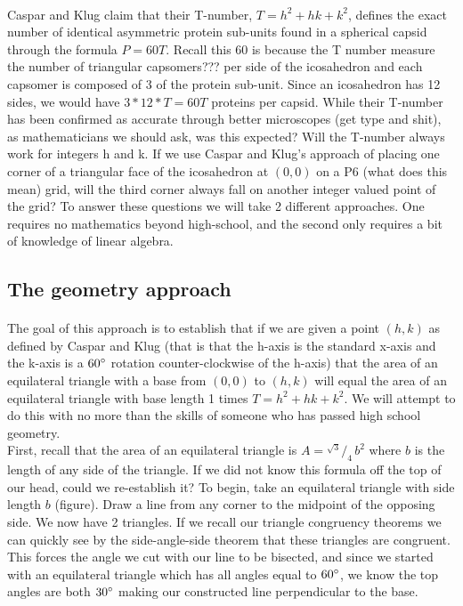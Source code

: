 \documentclass[12pt,letter]{article}
\newcommand*\rfrac[2]{{}^{#1}\!/_{#2}}
\begin{document}
\paragraph{}
Caspar and Klug claim that their T-number, $T = h^2 + hk + k^2$, defines the exact number of identical asymmetric protein sub-units found in a spherical capsid through the formula $P = 60T$. Recall this 60 is because the T number measure the number of triangular capsomers??? per side of the icosahedron and each capsomer is composed of 3 of the protein sub-unit. Since an icosahedron has 12 sides, we would have $3*12*T = 60T$ proteins per capsid. While their T-number has been confirmed as accurate through better microscopes (get type and shit), as mathematicians we should ask, was this expected? Will the T-number always work for integers h and k. If we use Caspar and Klug's approach of placing one corner of a triangular face of the icosahedron at $(0,0)$ on a P6 (what does this mean) grid, will the third corner always fall on another integer valued point of the grid? To answer these questions we will take 2 different approaches. One requires no mathematics beyond high-school, and the second only requires a bit of knowledge of linear algebra.

\subsection{The geometry approach}

\paragraph{}
The goal of this approach is to establish that if we are given a point $(h,k)$ as defined by Caspar and Klug (that is that the h-axis is the standard x-axis and the k-axis is a $60\degree$ rotation counter-clockwise of the h-axis) that the area of an equilateral triangle with a base from $(0,0)$ to $(h,k)$ will equal the area of an equilateral triangle with base length 1 times $T = h^2 + hk + k^2$. We will attempt to do this with no more than the skills of someone who has passed high school geometry. \\

First, recall that the area of an equilateral triangle is $A = \rfrac {\sqrt{3}} {4} \, b^2$ where $b$ is the length of any side of the triangle. If we did not know this formula off the top of our head, could we re-establish it? To begin, take an equilateral triangle with side length $b$ (figure). Draw a line from any corner to the midpoint of the opposing side. We now have 2 triangles. If we recall our triangle congruency theorems we can quickly see by the side-angle-side theorem that these triangles are congruent. This forces the angle we cut with our line to be bisected, and since we started with an equilateral triangle which has all angles equal to $60\degree$, we know the top angles are both $30\degree$ making our constructed line perpendicular to the base. \\
\end{document}
